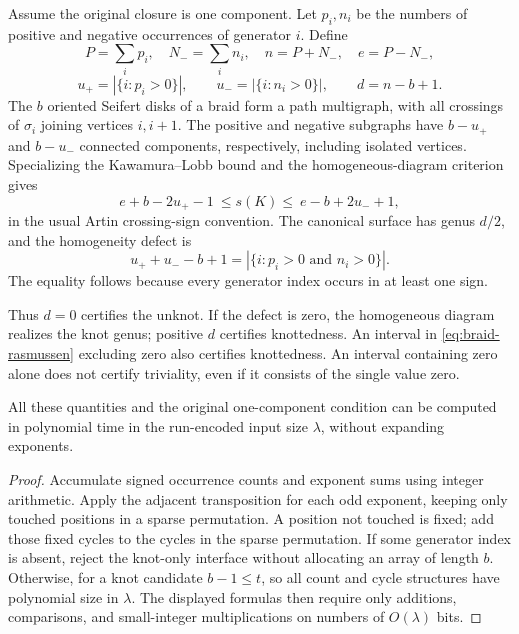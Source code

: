 Assume the original closure is one component. Let \(p_i,n_i\) be the numbers
of positive and negative occurrences of generator \(i\). Define
\[
P=\sum_i p_i,\quad N_-=\sum_i n_i,\quad n=P+N_-,\quad e=P-N_-,
\]
\[
u_+=|\{i:p_i>0\}|,\qquad u_-=|\{i:n_i>0\}|,\qquad d=n-b+1.
\]
The \(b\) oriented Seifert disks of a braid form a path multigraph, with
all crossings of \(\sigma_i\) joining vertices \(i,i+1\). The positive
and negative subgraphs have \(b-u_+\) and \(b-u_-\) connected components,
respectively, including isolated vertices.
Specializing the Kawamura--Lobb bound and the homogeneous-diagram
criterion~\cite{lobb,abe,cromwell} gives
\begin{equation}\label{eq:braid-rasmussen}
e+b-2u_+-1\ \le s(K)\le\ e-b+2u_-+1,
\end{equation}
in the usual Artin crossing-sign convention.
The canonical surface has genus \(d/2\), and the homogeneity defect is
\begin{equation}\label{eq:mixed}
u_++u_--b+1
=|\{i:p_i>0\text{ and }n_i>0\}|.
\end{equation}
The equality follows because every generator index occurs in at least
one sign.

Thus \(d=0\) certifies the unknot. If the defect is zero, the homogeneous
diagram realizes the knot genus; positive \(d\) certifies knottedness.
An interval in \eqref{eq:braid-rasmussen} excluding zero also certifies
knottedness. An interval containing zero alone does not certify triviality,
even if it consists of the single value zero.

\begin{proposition}\label{prop:rle}
All these quantities and the original one-component condition can be
computed in polynomial time in the run-encoded input size \(\lambda\),
without expanding exponents.
\end{proposition}

\begin{proof}
Accumulate signed occurrence counts and exponent sums using integer
arithmetic. Apply the adjacent transposition for each odd exponent, keeping
only touched positions in a sparse permutation. A position not touched is
fixed; add those fixed cycles to the cycles in the sparse permutation.
If some generator index is absent, reject the knot-only interface without
allocating an array of length \(b\).
Otherwise, for a knot candidate \(b-1\le t\), so all count and cycle
structures have polynomial size in \(\lambda\).
The displayed formulas then require only additions, comparisons, and
small-integer multiplications on numbers of \(O(\lambda)\) bits.
\end{proof}

